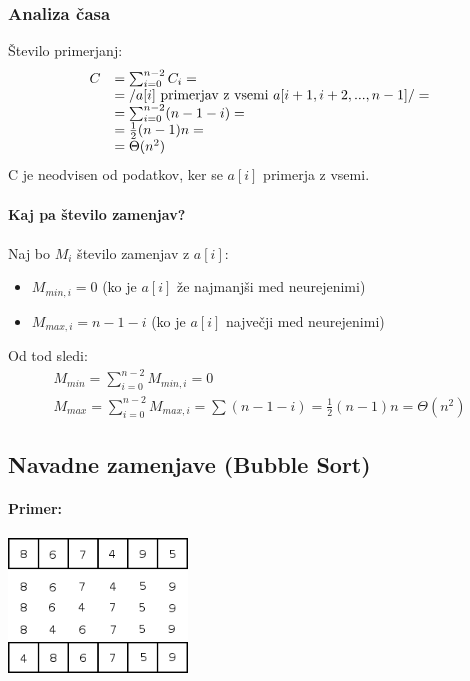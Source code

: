 \documentclass[a4paper,10pt]{article}
\begin{document}
\subsubsection{Analiza \v casa}

\v Stevilo primerjanj:
$$
\begin{array}{ll}
C & = \sum_{i=0}^{n-2}C_{i} = \\
  & = \left / a[i] \mbox{ primerjav z vsemi } a[i+1,i+2,...,n-1] \right / = \\
  & = \sum_{i=0}^{n-2} (n-1-i) = \\
  & = \frac{1}{2} (n-1)n = \\
  & = \Theta (n^2)
\end{array}
$$
C je neodvisen od podatkov, ker se $a[i]$ primerja z vsemi.\\
\\
\textbf{Kaj pa \v stevilo zamenjav?}\\
\\
Naj bo $M_{i}$ \v stevilo zamenjav z $a[i]$:
\begin{itemize}
\item $M_{min,i}=0$ (ko je $a[i]$ \v ze najmanj\v si med neurejenimi)
\item $M_{max,i}=n-1-i$ (ko je $a[i]$ najve\v cji med neurejenimi)
\end{itemize}
Od tod sledi:
$$
\begin{array}{l}
M_{min}=\sum_{i=0}^{n-2} M_{min,i}=0\\
M_{max}=\sum_{i=0}^{n-2} M_{max,i}=\sum(n-1-i)=\frac{1}{2} (n-1)n=\Theta (n^2)
\end{array}
$$

\subsection{Navadne zamenjave (Bubble Sort)}

\paragraph{Primer:}
	\begin{center}
	\includegraphics[width=4.75cm,height=3.6cm]{Slike/NavadneZamenjavePrimer.png}
	\end{center}
\end{document}
